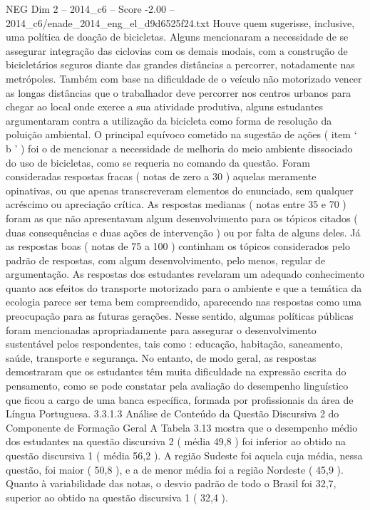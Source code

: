 \begin{textsample}{NEG Dim 2 – 2014\_c6 – Score -2.00 – 2014\_c6/enade\_2014\_eng\_el\_d9d6525f24.txt}
Houve quem sugerisse, inclusive, uma política de doação de bicicletas.
Alguns mencionaram a necessidade de se assegurar integração das ciclovias com os demais modais, com a construção de bicicletários seguros diante das grandes distâncias a percorrer, notadamente nas metrópoles.
Também com base na dificuldade de o veículo não motorizado vencer as longas distâncias que o trabalhador deve percorrer nos centros urbanos para chegar ao local onde exerce a sua atividade produtiva, alguns estudantes argumentaram contra a utilização da bicicleta como forma de resolução da poluição ambiental.
O principal equívoco cometido na sugestão de ações ( item ‘ b ’ ) foi o de mencionar a necessidade de melhoria do meio ambiente dissociado do uso de bicicletas, como se requeria no comando da questão.
Foram consideradas respostas fracas ( notas de zero a 30 ) aquelas meramente opinativas, ou que apenas transcreveram elementos do enunciado, sem qualquer acréscimo ou apreciação crítica.
As respostas medianas ( notas entre 35 e 70 ) foram as que não apresentavam algum desenvolvimento para os tópicos citados ( duas consequências e duas ações de intervenção ) ou por falta de alguns deles.
Já as respostas boas ( notas de 75 a 100 ) continham os tópicos considerados pelo padrão de respostas, com algum desenvolvimento, pelo menos, regular de argumentação.
As respostas dos estudantes revelaram um adequado conhecimento quanto aos efeitos do transporte motorizado para o ambiente e que a temática da ecologia parece ser tema bem compreendido, aparecendo nas respostas como uma preocupação para as futuras gerações.
Nesse sentido, algumas políticas públicas foram mencionadas apropriadamente para assegurar o desenvolvimento sustentável pelos respondentes, tais como : educação, habitação, saneamento, saúde, transporte e segurança.
No entanto, de modo geral, as respostas demostraram que os estudantes têm muita dificuldade na expressão escrita do pensamento, como se pode constatar pela avaliação do desempenho linguístico que ficou a cargo de uma banca específica, formada por profissionais da área de Língua Portuguesa. 3.3.1.3 Análise de Conteúdo da Questão Discursiva 2 do Componente de Formação Geral A Tabela 3.13 mostra que o desempenho médio dos estudantes na questão discursiva 2 ( média 49,8 ) foi inferior ao obtido na questão discursiva 1 ( média 56,2 ).
A região Sudeste foi aquela cuja média, nessa questão, foi maior ( 50,8 ), e a de menor média foi a região Nordeste ( 45,9 ).
Quanto à variabilidade das notas, o desvio padrão de todo o Brasil foi 32,7, superior ao obtido na questão discursiva 1 ( 32,4 ).

\end{textsample}
